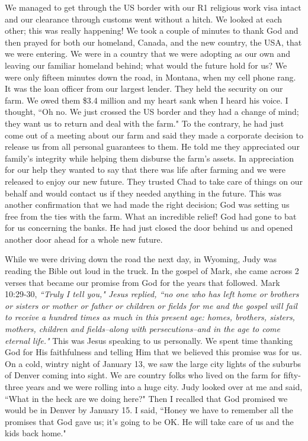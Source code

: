 \documentclass[oneside]{book}
\begin{document}
We managed to get through the US border with our R1 religious work visa intact and our clearance through customs went without a hitch. We looked at each other; this was really happening! We took a couple of minutes to thank God and then prayed for both our homeland, Canada, and the new country, the USA, that we were entering.  We were in a country that we were adopting as our own and leaving our familiar homeland behind; what would the future hold for us? We were only fifteen minutes down the road, in Montana, when my cell phone rang. It was the loan officer from our largest lender. They held the security on our farm. We owed them \$3.4 million and my heart sank when I heard his voice. I thought, ``Oh no. We just crossed the US border and they had a change of mind; they want us to return and deal with the farm." To the contrary, he had just come out of a meeting about our farm and said they made a corporate decision to release us from all personal guarantees to them. He told me they appreciated our family's integrity while helping them disburse the farm's assets. In appreciation for our help they wanted to say that there was life after farming and we were released to enjoy our new future. They trusted Chad to take care of things on our behalf and would contact us if they needed anything in the future. This was another confirmation that we had made the right decision; God was setting us free from the ties with the farm. What an incredible relief! God had gone to bat for us concerning the banks. He had just closed the door behind us and opened another door ahead for a whole new future.

While we were driving down the road the next day, in Wyoming, Judy was reading the Bible out loud in the truck. In the gospel of Mark, she came across 2 verses that became our promise from God for the years that followed. Mark 10:29-30, \textit{``Truly I tell you," Jesus replied, ``no one who has left home or brothers or sisters or mother or father or children or fields for me and the gospel will fail to receive a hundred times as much in this present age: homes, brothers, sisters, mothers, children and fields--along with persecutions--and in the age to come eternal life."} This was Jesus speaking to us personally. We spent time thanking God for His faithfulness and telling Him that we  believed this promise was for us. On a cold, wintry night of January 13, we saw the large city lights of the suburbs of Denver coming into sight. We are country folks who lived on the farm for fifty-three years and we were rolling into a huge city. Judy looked over at me and said, ``What in the heck are we doing here?" Then I recalled that God promised we would be in Denver by January 15. I said, ``Honey we have to remember all the promises that God gave us; it's going to be OK. He will take care of us and the kids back home."  
\end{document}
